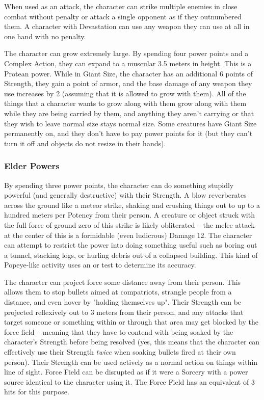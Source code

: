 When used as an attack, the character can strike multiple enemies in close combat without penalty or attack a single opponent as if they outnumbered them. A character with Devastation can use any weapon they can use at all in one hand with no penalty.

 The character can grow extremely large. By spending four power points and a Complex Action, they can expand to a muscular 3.5 meters in height. This is a Protean power. While in Giant Size, the character has an additional 6 points of Strength, they gain a point of armor, and the base damage of any weapon they use increases by 2 (assuming that it is allowed to grow with them). All of the things that a character wants to grow along with them grow along with them while they are being carried by them, and anything they aren't carrying or that they wish to leave normal size stays normal size.
Some creatures have Giant Size permanently on, and they don't have to pay power points for it (but they can't turn it off and objects do not resize in their hands).

\subsubsection{Elder Powers}

 By spending three power points, the character can do something stupidly powerful (and generally destructive) with their Strength. A blow reverberates across the ground like a meteor strike, shaking and crushing things out to up to a hundred meters per Potency from their person.  A creature or object struck with the full force of ground zero of this strike is likely obliterated -- the melee attack at the center of this is a formidable (even ludicrous) Damage 12. The character can attempt to restrict the power into doing something useful such as boring out a tunnel, stacking logs, or hurling debris out of a collapsed building. This kind of Popeye-like activity uses an  or  test to determine its accuracy.

 The character can project force some distance away from their person. This allows them to stop bullets aimed at compatriots, strangle people from a distance, and even hover by "holding themselves up". Their Strength can be projected reflexively out to 3 meters from their person, and any attacks that target someone or something within or through that area may get blocked by the force field -- meaning that they have to contend with being soaked by the character's Strength before being resolved (yes, this means that the character can effectively use their Strength \textit{twice} when soaking bullets fired at their own person). Their Strength can be used actively as a normal action on things within line of sight. Force Field can be disrupted as if it were a Sorcery with a power source identical to the character using it. The Force Field has an equivalent of 3 hits for this purpose.



